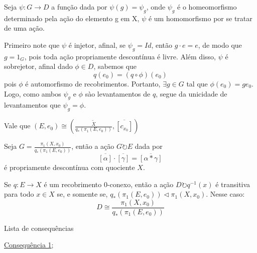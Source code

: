 \begin{dem}
    Seja $\psi:G \longrightarrow D$ a função dada por $\psi(g) = \psi_g$, onde $\psi_g$ é o homeomorfismo determinado pela ação do elemento g em X, $\psi$ é um homomorfismo por se tratar de uma ação.

    Primeiro note que $\psi$ é injetor, afinal, se $\psi_g = Id$, então $g \cdot e = e$, de modo que $g = 1_G$, pois toda ação propriamente descontínua é livre. Além disso, $\psi$ é sobrejetor, afinal dado $\phi \in D$, sabemos que $$q(e_0) = (q \circ \phi)(e_0)$$ pois $\phi$ é automorfismo de recobrimentos. Portanto, $\exists g \in G$ tal que $\phi(e_0) = ge_0$. Logo, como ambos $\psi_g$ e $\phi$ sào levantamentos de $q$, segue da unicidade de levantamentos que $\psi_g = \phi$.
\end{dem}

\begin{af}
    Vale que $(E, e_0) \cong (\frac{\tilde X}{q_*(\pi_1(E, e_0))}, \overline{[c_{x_0}]})$
\end{af}

\begin{af}
    Seja $G = \frac{\pi_1(X, x_0)}{q_*(\pi_1(E, e_0))}$, então a ação $G \circlearrowright E$ dada por $$\overline{[\alpha]} \cdot \overline{[\gamma]} = \overline{[\alpha * \gamma]}$$ é propriamente descontínua com quociente $X$.
\end{af}

\begin{thm}
	Se $q:E \longrightarrow X$ é um recobrimento $0$-conexo, então a ação $D \circlearrowright q^{-1}(x)$ é transitiva para todo $x \in X$ se, e somente se, $q_*(\pi_1(E, e_0)) \triangleleft \pi_1(X, x_0)$. Nesse caso: $$D \cong \frac{\pi_1(X, x_0)}{q_*(\pi_1(E, e_0))}$$
\end{thm}

\begin{titlemize}{Lista de consequências}
	\item \hyperref[consequencia1]{Consequência 1};\\ %
	\item \hyperref[]{}
\end{titlemize}